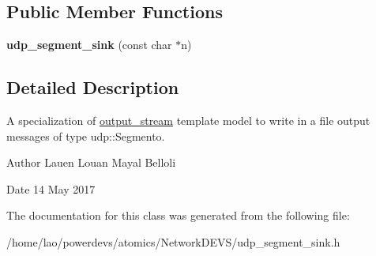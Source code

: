 \subsection*{Public Member Functions}
\begin{DoxyCompactItemize}
\item 
{\bfseries udp\+\_\+segment\+\_\+sink} (const char $\ast$n)\hypertarget{classudp__segment__sink_a61bd73218f0cb2ea949aada272f37fde}{}\label{classudp__segment__sink_a61bd73218f0cb2ea949aada272f37fde}

\end{DoxyCompactItemize}


\subsection{Detailed Description}
A specialization of \hyperlink{classoutput__stream}{output\+\_\+stream} template model to write in a file output messages of type udp\+::\+Segmento. 

\begin{DoxyAuthor}{Author}
Lauen Louan Mayal Belloli 
\end{DoxyAuthor}
\begin{DoxyDate}{Date}
14 May 2017 
\end{DoxyDate}


The documentation for this class was generated from the following file\+:\begin{DoxyCompactItemize}
\item 
/home/lao/powerdevs/atomics/\+Network\+D\+E\+V\+S/udp\+\_\+segment\+\_\+sink.\+h\end{DoxyCompactItemize}
